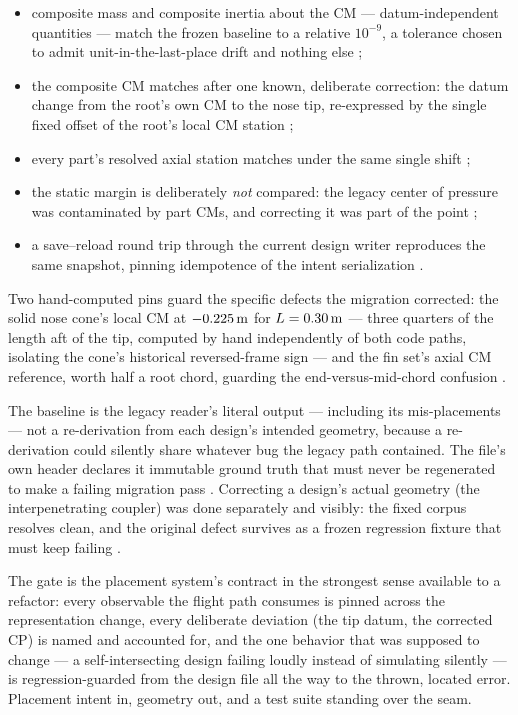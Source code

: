 \begin{itemize}
\item composite mass and composite inertia about the CM --- datum-independent quantities
  --- match the frozen baseline to a relative $10^{-9}$, a tolerance chosen to admit
  unit-in-the-last-place drift and nothing else
  ;
\item the composite CM matches after one known, deliberate correction: the datum change
  from the root's own CM to the nose tip, re-expressed by the single fixed offset of the
  root's local CM station ;
\item every part's resolved axial station matches under the same single shift
  ;
\item the static margin is deliberately \emph{not} compared: the legacy center of
  pressure was contaminated by part CMs, and correcting it was part of the point
  ;
\item a save--reload round trip through the current design writer reproduces the same
  snapshot, pinning idempotence of the intent serialization
  .
\end{itemize}

Two hand-computed pins guard the specific defects the migration corrected: the solid nose
cone's local CM at $-0.225\,\mathrm{m}$ for $L = 0.30\,\mathrm{m}$ --- three quarters of the length aft of
the tip, computed by hand independently of both code paths, isolating the cone's
historical reversed-frame sign  --- and the
fin set's axial CM reference, worth half a root chord, guarding the end-versus-mid-chord
confusion .

\begin{keyinsight}
The baseline is the legacy reader's literal output --- including its mis-placements ---
not a re-derivation from each design's intended geometry, because a re-derivation could
silently share whatever bug the legacy path contained. The file's own header declares it
immutable ground truth that must never be regenerated to make a failing migration pass
. Correcting a design's actual geometry (the
interpenetrating coupler) was done separately and visibly: the fixed corpus resolves
clean, and the original defect survives as a frozen regression fixture that must keep
failing .
\end{keyinsight}

The gate is the placement system's contract in the strongest sense available to a
refactor: every observable the flight path consumes is pinned across the representation
change, every deliberate deviation (the tip datum, the corrected CP) is named and
accounted for, and the one behavior that was supposed to change --- a self-intersecting
design failing loudly instead of simulating silently --- is regression-guarded from the
design file all the way to the thrown, located error. Placement intent in, geometry out,
and a test suite standing over the seam.
